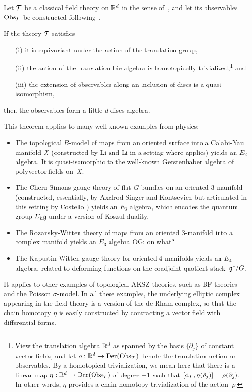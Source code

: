 \documentclass[11pt]{amsart}
\def\owen#1{{\textcolor{violet!50!black}{OG: {#1}}}}
\begin{document}
\begin{thm}
\label{thm: EllSaf}
Let $\mathcal T$ be a classical field theory on $\mathbb R^d$ in the sense of~\cite{CosBook},
and let its observables ${\rm Obs}_\mathcal T$ be constructed following~\cite{CG2}.

If the theory $\mathcal T$ satisfies 
\begin{enumerate}
\item[(i)] it is equivariant under the action of the translation group,
\item[(ii)] the action of the translation Lie algebra is homotopically trivialized,\footnote{View the translation algebra $\mathbb R^d$ as spanned by the basis $\{\partial_j\}$ of constant vector fields, and let $\rho: \mathbb R^d \to {\rm Der}({\rm Obs}_\mathcal T)$ denote the translation action on observables.
By a homotopical trivialization, we mean here that there is a linear map $\eta: \mathbb R^d \to {\rm Der}({\rm Obs}_\mathcal T)$ of degree $-1$ such that $[{\rm d}_{\mathcal T}, \eta(\partial_j)] = \rho(\partial_j)$.
In other words, $\eta$ provides a chain homotopy trivialization of the action~$\rho$.} 
and
\item[(iii)] the extension of observables along an inclusion of discs is a quasi-isomorphism,
\end{enumerate}
then the observables form a little $d$-discs algebra.
\end{thm}

This theorem applies to many well-known examples from physics:
\begin{itemize}
\item The topological $B$-model of maps from an oriented surface into a Calabi-Yau manifold $X$ (constructed by Li and Li \cite{LiLi} in a setting where \cite{EllSaf} applies) yields an $E_2$ algebra. It is quasi-isomorphic to the well-known Gerstenhaber algebra of polyvector fields on~$X$.
\item The Chern-Simons gauge theory of flat $G$-bundles on an oriented 3-manifold (constructed, essentially, by Axelrod-Singer \cite{AxeSin} and Kontsevich \cite{KonECM} but articulated in this setting by Costello \cite{CosBook}) yields an $E_3$ algebra, which encodes the quantum group $U_\hbar \mathfrak g$ under a version of Koszul duality.
\item The Rozansky-Witten theory of maps from an oriented 3-manifold into a complex manifold \cite{ChanLeungLi} yields an $E_3$ algebra \owen{on what?}
\item The Kapustin-Witten gauge theory for oriented 4-manifolds \cite{EGW} yields an $E_4$ algebra, related to deforming functions on the coadjoint quotient stack~$\mathfrak g^*/G$.
\end{itemize}
It applies to other examples of topological AKSZ theories, such as BF theories and the Poisson $\sigma$-model.
In all these examples, the underlying elliptic complex appearing in the field theory is a version of the de Rham complex,
so that the chain homotopy $\eta$ is easily constructed by contracting a vector field with differential forms.
\end{document}

